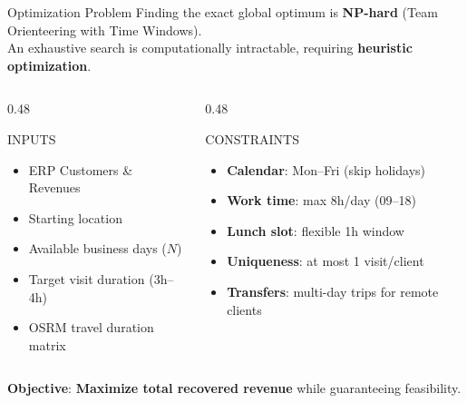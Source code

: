 \begin{frame}{Optimization Problem}
\small
Finding the exact global optimum is \textbf{NP-hard} (Team Orienteering with Time Windows).\\
An exhaustive search is computationally intractable, requiring \textbf{heuristic optimization}.

\vspace{0.15cm}
\begin{columns}[T,onlytextwidth]
\begin{column}{0.48\textwidth}
\begin{block}{INPUTS}
\footnotesize
\begin{itemize}\setlength{\itemsep}{1pt}
    \item ERP Customers \& Revenues
    \item Starting location
    \item Available business days ($N$)
    \item Target visit duration (3h--4h)
    \item OSRM travel duration matrix
\end{itemize}
\end{block}
\end{column}

\begin{column}{0.48\textwidth}
\begin{block}{CONSTRAINTS}
\footnotesize
\begin{itemize}\setlength{\itemsep}{1pt}
    \item \textbf{Calendar}: Mon--Fri (skip holidays)
    \item \textbf{Work time}: max 8h/day (09--18)
    \item \textbf{Lunch slot}: flexible 1h window
    \item \textbf{Uniqueness}: at most 1 visit/client
    \item \textbf{Transfers}: multi-day trips for remote clients
\end{itemize}
\end{block}
\end{column}
\end{columns}

\vspace{0.95cm}
\small
\textbf{Objective}: \textbf{Maximize total recovered revenue} while guaranteeing feasibility.
\end{frame}
